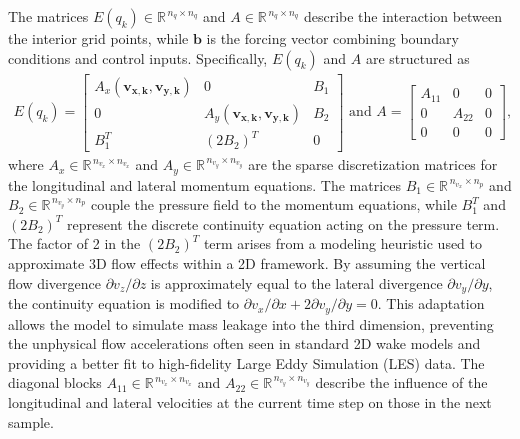 The matrices $E(q_k) \in \mathbb{R}^{\,n_{q} \times n_{q}}$ and $A \in \mathbb{R}^{\,n_{q} \times n_{q}}$ describe the interaction between the interior grid points, while $\bm{b}$ is the forcing vector combining boundary conditions and control inputs. Specifically, $E(q_k)$ and $A$ are structured as
\begin{align} \label{eq:AGrid}
    E(q_k) =
    \begin{bmatrix}
        A_x(\bm{v_{x,k}},\bm{v_{y,k}}) & 0   & B_1 \\
        0   & A_y(\bm{v_{x,k}},\bm{v_{y,k}}) & B_2 \\
        B_1^T   & (2 B_2)^T   & 0
    \end{bmatrix} \text{ and } 
    A =
    \begin{bmatrix}
        A_{11} & 0   & 0 \\
        0   & A_{22} &0 \\
        0   & 0   & 0
    \end{bmatrix},
\end{align}
where $A_x \in \mathbb{R}^{\,n_{v_x} \times n_{v_x}}$ and $A_y \in \mathbb{R}^{\,n_{v_y} \times n_{v_y}}$ are the sparse discretization matrices for the longitudinal and lateral momentum equations. The matrices $B_1 \in \mathbb{R}^{\,n_{v_x} \times n_p}$ and $B_2 \in \mathbb{R}^{\,n_{v_y} \times n_p}$ couple the pressure field to the momentum equations, while $B_1^T$ and $(2 B_2)^T$ represent the discrete continuity equation acting on the pressure term. The factor of 2 in the $(2B_2)^T$ term arises from a modeling heuristic used to approximate 3D flow effects within a 2D framework. By assuming the vertical flow divergence $\partial v_z / \partial z$ is approximately equal to the lateral divergence $\partial v_y / \partial y$, the continuity equation is modified to $\partial v_x / \partial x + 2\partial v_y / \partial y = 0$. This adaptation allows the model to simulate mass leakage into the third dimension, preventing the unphysical flow accelerations often seen in standard 2D wake models and providing a better fit to high-fidelity Large Eddy Simulation (LES) data. The diagonal blocks $A_{11} \in \mathbb{R}^{\,n_{v_x} \times n_{v_x}}$ and $A_{22} \in \mathbb{R}^{\,n_{v_y} \times n_{v_y}}$ describe the influence of the longitudinal and lateral velocities at the current time step on those in the next sample.

